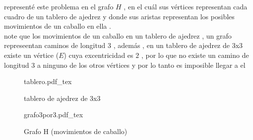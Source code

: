 \documentclass[10pt,a4paper]{article} %
\newcommand{\incfig}[1]{%
    \def\svgwidth{\columnwidth}
    {#1.pdf_tex}
}
\begin{document}
    \newpage
    representé este problema en el grafo $H$ , en el cuál sus vértices
    representan cada cuadro de un tablero de ajedrez y donde sus aristas
    representan los posibles movimientos de un caballo en ella .
    \\
    note que los movimientos de un caballo en un tablero de ajedrez , un
    grafo represeentan caminos de longitud 3 , además , en un tablero de
    ajedrez de 3x3 existe un vértice ($E$) cuya excentricidad es $2$ , por lo que no
    existe un camino de longitud 3 a ninguno de los otros vértices y por lo
    tanto es imposible llegar a el

    \begin{figure}[ht]
        \centering
        \incfig{tablero}
        \caption{tablero de ajedrez de 3x3}
        \label{fig:tablero}
    \end{figure}


    \begin{figure}[ht]
        \centering
        \incfig{grafo3por3}
        \caption{Grafo H (movimientos de caballo)}
        \label{fig:grafo3por3}
    \end{figure}























    \nocite{*}
    
    
\end{document}
